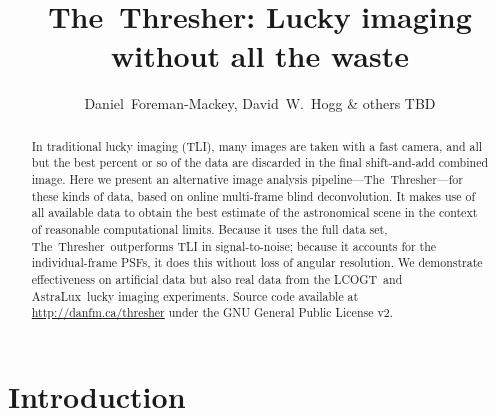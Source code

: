 \documentclass[12pt,preprint]{aastex}
\newcommand{\project}[1]{{\sffamily #1}}
\newcommand{\TheThresher}{\project{The~Thresher}}
\newcommand{\LCOGT}{\project{LCOGT}}
\newcommand{\AstraLux}{\project{AstraLux}}
\newcommand{\license}{GNU General Public License v2}
\begin{document}
\title{\TheThresher: Lucky imaging without all the waste}

\author{%
    Daniel~Foreman-Mackey\altaffilmark{\ref{CCPP},\ref{email}},
    David~W.~Hogg\altaffilmark{\ref{CCPP},\ref{MPIA}}
    \& others TBD
}

\setcounter{address}{1}

\begin{abstract}
    In traditional lucky imaging (TLI), many images are taken with a
    fast camera, and all but the best percent or so of the data are
    discarded in the final shift-and-add combined image.  Here we
    present an alternative image analysis
    pipeline---\TheThresher---for these kinds of data, based on online
    multi-frame blind deconvolution.  It makes use of all available
    data to obtain the best estimate of the astronomical scene in the
    context of reasonable computational limits.  Because it uses the
    full data set, \TheThresher\ outperforms TLI in signal-to-noise;
    because it accounts for the individual-frame PSFs, it does this
    without loss of angular resolution.  We demonstrate effectiveness
    on artificial data but also real data from the \LCOGT\ and
    \AstraLux\ lucky imaging experiments.  Source code available at
    \url{http://danfm.ca/thresher} under the \license.
\end{abstract}


\clearpage

\section{Introduction}
\end{document}
